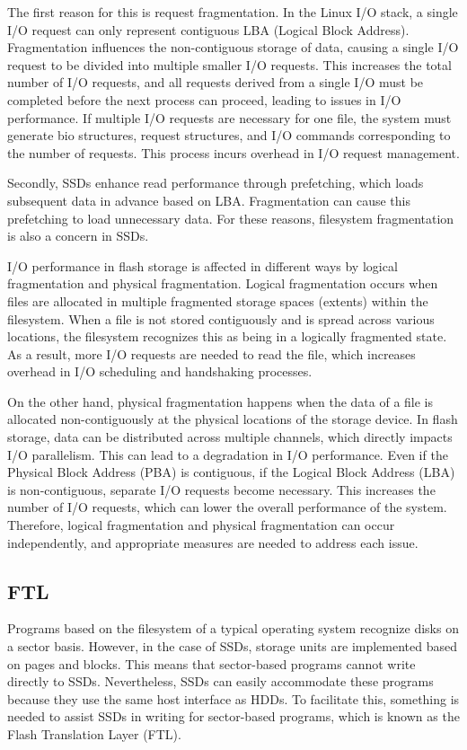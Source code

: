 The first reason for this is request fragmentation.
In the Linux I/O stack, a single I/O request can only represent contiguous LBA (Logical Block Address).
Fragmentation influences the non-contiguous storage of data, causing a single I/O request to be divided into multiple smaller I/O requests.\cite{IO}
This increases the total number of I/O requests, and all requests derived from a single I/O must be completed before the next process can proceed, leading to issues in I/O performance.
If multiple I/O requests are necessary for one file, the system must generate bio structures, request structures, and I/O commands corresponding to the number of requests. This process incurs overhead in I/O request management.

Secondly, SSDs enhance read performance through prefetching, which loads subsequent data in advance based on LBA.
Fragmentation can cause this prefetching to load unnecessary data.\cite{Defragmentation_Log_write_is_ssd_to_bad} For these reasons, filesystem fragmentation is also a concern in SSDs.

 I/O performance in flash storage is affected in different ways by logical fragmentation and physical fragmentation.\cite{Logical_Fragmentation_vs_physical_Fragmentation}
Logical fragmentation occurs when files are allocated in multiple fragmented storage spaces (extents) within the filesystem.
When a file is not stored contiguously and is spread across various locations, the filesystem recognizes this as being in a logically fragmented state.
As a result, more I/O requests are needed to read the file, which increases overhead in I/O scheduling and handshaking processes.

On the other hand, physical fragmentation happens when the data of a file is allocated non-contiguously at the physical locations of the storage device.
In flash storage, data can be distributed across multiple channels, which directly impacts I/O parallelism.
This can lead to a degradation in I/O performance.
Even if the Physical Block Address (PBA) is contiguous, if the Logical Block Address (LBA) is non-contiguous, separate I/O requests become necessary.
This increases the number of I/O requests, which can lower the overall performance of the system.
Therefore, logical fragmentation and physical fragmentation can occur independently, and appropriate measures are needed to address each issue.

\subsection{FTL}
Programs based on the filesystem of a typical operating system recognize disks on a sector basis.
However, in the case of SSDs, storage units are implemented based on pages and blocks.
This means that sector-based programs cannot write directly to SSDs.
Nevertheless, SSDs can easily accommodate these programs because they use the same host interface as HDDs.
To facilitate this, something is needed to assist SSDs in writing for sector-based programs, which is known as the Flash Translation Layer (FTL).

